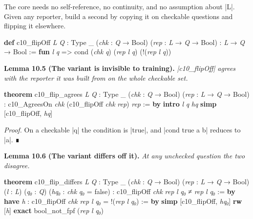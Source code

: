 \documentclass{memoir}
\begin{document}
The core needs no self-reference, no continuity, and no assumption about \LeanVerb|L|.
Given any reporter, build a second by copying it on checkable questions and
flipping it elsewhere.

\begin{LeanVerbatim}
\textbf{def} c10_flipOff \textit{L} \textit{Q} : Type _
    (\textit{chk} : \textit{Q} → Bool) (\textit{rep} : \textit{L} → \textit{Q} → Bool) : \textit{L} → \textit{Q} → Bool :=
  \textbf{fun} \textit{l} \textit{q} => cond (\textit{chk} \textit{q}) (\textit{rep} \textit{l} \textit{q}) (!(\textit{rep} \textit{l} \textit{q}))

\end{LeanVerbatim}


\textbf{Lemma 10.5 (The variant is invisible to training).} \emph{\LeanVerb|c10_flipOff| agrees
with the reporter it was built from on the whole checkable set.}

\begin{LeanVerbatim}
\textbf{theorem} c10_flip_agrees \textit{L} \textit{Q} : Type _
    (\textit{chk} : \textit{Q} → Bool) (\textit{rep} : \textit{L} → \textit{Q} → Bool) :
    c10_AgreesOn \textit{chk} (c10_flipOff \textit{chk} \textit{rep}) \textit{rep} := \textbf{by}
  \textbf{intro} \textit{l} \textit{q} \textit{hq}
  \textbf{simp} [c10_flipOff, \textit{hq}]

\end{LeanVerbatim}


\emph{Proof.} On a checkable \LeanVerb|q| the condition is \LeanVerb|true|, and \LeanVerb|cond true a b|
reduces to \LeanVerb|a|. ∎

\textbf{Lemma 10.6 (The variant differs off it).} \emph{At any unchecked question the
two disagree.}

\begin{LeanVerbatim}
\textbf{theorem} c10_flip_differs \textit{L} \textit{Q} : Type _
    (\textit{chk} : \textit{Q} → Bool) (\textit{rep} : \textit{L} → \textit{Q} → Bool)
    (\textit{l} : \textit{L}) (\textit{q₀} : \textit{Q}) (\textit{hq₀} : \textit{chk} \textit{q₀} = false) :
    c10_flipOff \textit{chk} \textit{rep} \textit{l} \textit{q₀} ≠ \textit{rep} \textit{l} \textit{q₀} := \textbf{by}
  \textbf{have} \textit{h} : c10_flipOff \textit{chk} \textit{rep} \textit{l} \textit{q₀} = !(\textit{rep} \textit{l} \textit{q₀}) := \textbf{by}
    \textbf{simp} [c10_flipOff, \textit{hq₀}]
  \textbf{rw} [\textit{h}]
  \textbf{exact} bool_not_fpf (\textit{rep} \textit{l} \textit{q₀})

\end{LeanVerbatim}
\end{document}
